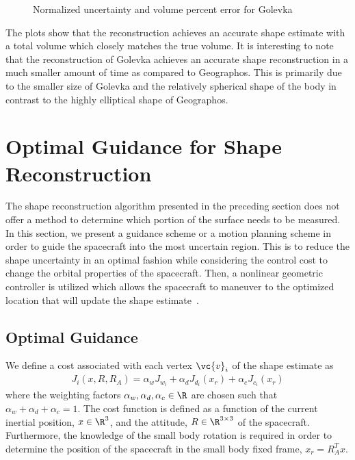 \documentclass[smallextended]{svjour3}       %
\begin{document}
\begin{figure}[htbp]
    \centering
    
    \caption{Normalized uncertainty and volume percent error for Golevka\label{fig:golevka_metrics}}
\end{figure}

The plots show that the reconstruction achieves an accurate shape estimate with a total volume which closely matches the true volume.
It is interesting to note that the reconstruction of Golevka achieves an accurate shape reconstruction in a much smaller amount of time as compared to Geographos.
This is primarily due to the smaller size of Golevka and the relatively spherical shape of the body in contrast to the highly elliptical shape of Geographos.

\section{Optimal Guidance for Shape Reconstruction}\label{sec:explore_asteroid}

The shape reconstruction algorithm presented in the preceding section does not offer a method to determine which portion of the surface needs to be measured. 
In this section, we present a guidance scheme or a motion planning scheme in order to guide the spacecraft into the most uncertain region. 
This is to reduce the shape uncertainty in an optimal fashion while considering the control cost to change the orbital properties of the spacecraft. 
Then, a nonlinear geometric controller is utilized which allows the spacecraft to maneuver to the optimized location that will update the shape estimate~\cite{kulumani2017b}.

\subsection{Optimal Guidance}

We define a cost associated with each vertex \( \vc{v}_i \) of the shape estimate as
\begin{align}\label{eq:explore_cost}
    J_i (x, R, R_A) = \alpha_w J_{w_i} + \alpha_d J_{d_i}(x_r) + \alpha_c J_{c_i}(x_r)
\end{align}
where the weighting factors \( \alpha_w, \alpha_d, \alpha_c \in \R \) are chosen such that \( \alpha_w + \alpha_d + \alpha_c = 1 \).
The cost function is defined as a function of the current inertial position, \( x \in \R^3 \), and the attitude, \( R \in \R^{3\times3}\) of the spacecraft.
Furthermore, the knowledge of the small body rotation is required in order to determine the position of the spacecraft in the small body fixed frame, \( x_r = R_A^T x\).
\end{document}
